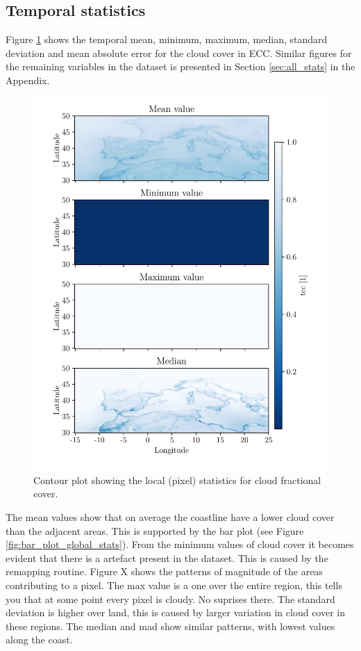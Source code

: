 \subsection{Temporal statistics}
Figure \ref{fig:all_stats_tcc} shows the temporal mean, minimum, maximum, median, standard deviation and mean absolute error for the cloud cover in ECC. Similar figures for the remaining variables in the dataset is presented in Section \ref{sec:all_stats} in the Appendix. 
\begin{figure}[ht]
    \centering
    \includegraphics{python_figs/all_stat_variable_tcc.pdf}
    \caption{Contour plot showing the local (pixel) statistics for cloud fractional cover.}
    \label{fig:all_stats_tcc}
\end{figure}

The mean values show that on average the coastline have a lower cloud cover than the adjacent areas. This is supported by the bar plot (see Figure \ref{fig:bar_plot_global_stats}). From the minimum values of cloud cover it becomes evident that there is a  artefact present in the dataset. This is caused by the remapping routine. Figure X shows the patterns of magnitude of the areas contributing to a pixel. The max value is a one over the entire region, this tells you that at some point every pixel is cloudy. No suprises there. 
The standard deviation is higher over land, this is caused by larger variation in cloud cover in these regions. The median and mad show similar patterns, with lowest values along the coast.

